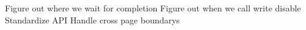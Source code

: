 
\begin{DoxyRefList}
\item[Member \mbox{\hyperlink{classS25FL512_abb7c4399e4a5fefb3b0581897b9bd04b}{S25\+FL512\+::S25\+FL512}} (uint8\+\_\+t chip\+Select\+Pin, SPIClass $\ast$spi\+Class=\&SPI)]\label{todo__todo000002}%
%
 Figure out where we wait for completion Figure out when we call write disable Standardize API Handle cross page boundary\textquotesingle{}s 
\end{DoxyRefList}